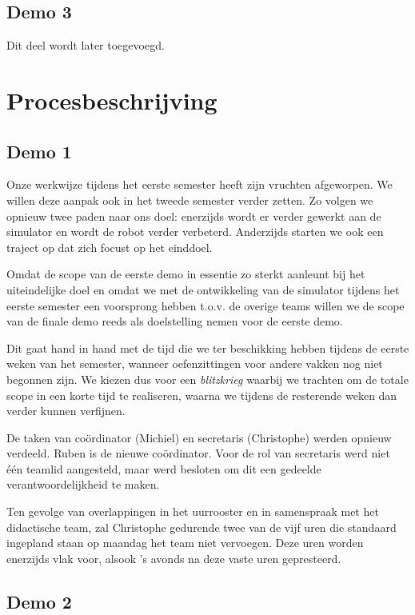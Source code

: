 \documentclass[12pt,a4paper]{report}
\begin{document}
\section{Demo 3}

Dit deel wordt later toegevoegd.

\chapter{Procesbeschrijving}
\label{ch:process}

\section{Demo 1}

Onze werkwijze tijdens het eerste semester heeft zijn vruchten afgeworpen. We willen deze aanpak ook in het tweede semester verder zetten. Zo volgen we opnieuw twee paden naar ons doel: enerzijds wordt er verder gewerkt aan de simulator en wordt de robot verder verbeterd. Anderzijds starten we ook een traject op dat zich focust op het einddoel.

Omdat de scope van de eerste demo in essentie zo sterkt aanleunt bij het uiteindelijke doel en omdat we met de ontwikkeling van de simulator tijdens het eerste semester een voorsprong hebben t.o.v. de overige teams willen we de scope van de finale demo reeds als doelstelling nemen voor de eerste demo.

Dit gaat hand in hand met de tijd die we ter beschikking hebben tijdens de eerste weken van het semester, wanneer oefenzittingen voor andere vakken nog niet begonnen zijn. We kiezen dus voor een \emph{blitzkrieg} waarbij we trachten om de totale scope in een korte tijd te realiseren, waarna we tijdens de resterende weken dan verder kunnen verfijnen.

De taken van co\"ordinator (Michiel) en secretaris (Christophe) werden opnieuw verdeeld. Ruben is de nieuwe co\"ordinator. Voor de rol van secretaris werd niet \'e\'en teamlid aangesteld, maar werd besloten om dit een gedeelde verantwoordelijkheid te maken.

Ten gevolge van overlappingen in het uurrooster en in samenspraak met het didactische team, zal Christophe gedurende twee van de vijf uren die standaard ingepland staan op maandag het team niet vervoegen. Deze uren worden enerzijds vlak voor, alsook 's avonds na deze vaste uren gepresteerd.

\section{Demo 2}
\end{document}
